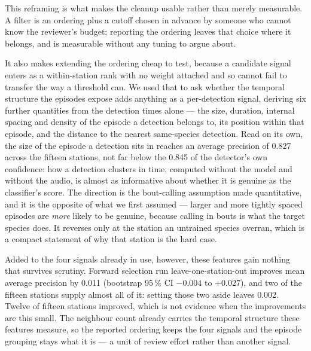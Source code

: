 \documentclass[final,3p,times]{elsarticle}
\begin{document}
This reframing is what makes the cleanup usable rather than merely measurable.
A filter is an ordering plus a cutoff chosen in advance by someone who cannot
know the reviewer's budget; reporting the ordering leaves that choice where it
belongs, and is measurable without any tuning to argue about.

It also makes extending the ordering cheap to test, because a candidate signal
enters as a within-station rank with no weight attached and so cannot fail to
transfer the way a threshold can. We used that to ask whether the temporal
structure the episodes expose adds anything as a per-detection signal, deriving
six further quantities from the detection times alone --- the size, duration,
internal spacing and density of the episode a detection belongs to, its position
within that episode, and the distance to the nearest same-species detection.
Read on its own, the size of the episode a detection sits in reaches an average
precision of 0.827 across the fifteen stations, not far below the 0.845 of the
detector's own confidence: how a detection clusters in time, computed without
the model and without the audio, is almost as informative about whether it is
genuine as the classifier's score. The direction is the bout-calling assumption
made quantitative, and it is the opposite of what we first assumed --- larger and
more tightly spaced episodes are \emph{more} likely to be genuine, because
calling in bouts is what the target species does. It reverses only at the
station an untrained species overran, which is a compact statement of why that
station is the hard case.

Added to the four signals already in use, however, these features gain nothing
that survives scrutiny. Forward selection run leave-one-station-out improves
mean average precision by 0.011 (bootstrap 95\,\% CI $-0.004$ to $+0.027$), and
two of the fifteen stations supply almost all of it: setting those two aside
leaves 0.002. Twelve of fifteen stations improved, which is not evidence when
the improvements are this small. The neighbour count already carries the
temporal structure these features measure, so the reported ordering keeps the
four signals and the episode grouping stays what it is --- a unit of review
effort rather than another signal.
\end{document}
